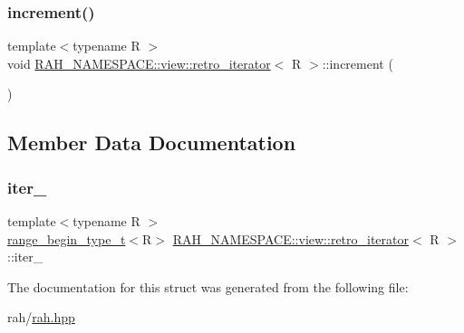 \mbox{\label{struct_r_a_h___n_a_m_e_s_p_a_c_e_1_1view_1_1retro__iterator_a9eb8615dcaec398cc57595dcb7822af2}} 
\subsubsection{\texorpdfstring{increment()}{increment()}}
{\footnotesize\ttfamily template$<$typename R $>$ \\
void \mbox{\hyperlink{struct_r_a_h___n_a_m_e_s_p_a_c_e_1_1view_1_1retro__iterator}{R\+A\+H\+\_\+\+N\+A\+M\+E\+S\+P\+A\+C\+E\+::view\+::retro\+\_\+iterator}}$<$ R $>$\+::increment (\begin{DoxyParamCaption}{ }\end{DoxyParamCaption})\hspace{0.3cm}{\ttfamily [inline]}}



\subsection{Member Data Documentation}
\mbox{\label{struct_r_a_h___n_a_m_e_s_p_a_c_e_1_1view_1_1retro__iterator_a610c34a743bd3c125feec7ad1eebbdad}} 
\subsubsection{\texorpdfstring{iter\_}{iter\_}}
{\footnotesize\ttfamily template$<$typename R $>$ \\
\mbox{\hyperlink{namespace_r_a_h___n_a_m_e_s_p_a_c_e_a46705781d6869d5151141f871ced1e9c}{range\+\_\+begin\+\_\+type\+\_\+t}}$<$R$>$ \mbox{\hyperlink{struct_r_a_h___n_a_m_e_s_p_a_c_e_1_1view_1_1retro__iterator}{R\+A\+H\+\_\+\+N\+A\+M\+E\+S\+P\+A\+C\+E\+::view\+::retro\+\_\+iterator}}$<$ R $>$\+::iter\+\_\+}



The documentation for this struct was generated from the following file\+:\begin{DoxyCompactItemize}
\item 
rah/\mbox{\hyperlink{rah_8hpp}{rah.\+hpp}}\end{DoxyCompactItemize}
